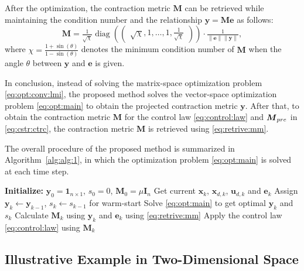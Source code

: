 \documentclass{ifacconf}
\newcommand*{\mv}[1]{\boldsymbol{#1}} %
\newcommand*{\mm}[1]{\boldsymbol{#1}} %
\newcommand*{\norm}[1]{\lVert #1 \rVert} %
\DeclareMathOperator{\mydiag}{{diag}}     %
\begin{document}
After the optimization, the contraction metric $\mm{M}$ can be retrieved while maintaining the condition number and the relationship $\mv{y}=\mm{M}\mv{e}$ as follows:
\begin{equation} \label{eq:retrive:mm}
   \mm{M}
   =
   \tfrac{1}{\sqrt{\chi}}
   \mydiag
   \left(
      \begin{pmatrix}
         \sqrt{\chi}, 1, \ldots, 1, \tfrac{1}{\sqrt{\chi}}
      \end{pmatrix}
   \right)
   \cdot
   \tfrac{1}{\norm{\mv{e}}\norm{\mv{y}}}
   ,
\end{equation}
where $\chi=\tfrac{1+\sin(\theta)}{1-\sin(\theta)}$ denotes the minimum condition number of $\mm{M}$ when the angle $\theta$ between $\mv{y}$ and $\mv{e}$ is given.

In conclusion, instead of solving the matrix-space optimization problem \eqref{eq:opt:conv:lmi}, the proposed method solves the vector-space optimization problem \eqref{eq:opt:main} to obtain the projected contraction metric $\mv{y}$.
After that, to obtain the contraction metric $\mm{M}$ for the control law \eqref{eq:control:law} and $\mm{M}_{\rm{pre}}$ in \eqref{eq:cstr:ctrc}, the contraction metric $\mm{M}$ is retrieved using \eqref{eq:retrive:mm}.
   
The overall procedure of the proposed method is summarized in Algorithm~\ref{alg:alg:1}, in which the optimization problem \eqref{eq:opt:main} is solved at each time step.

\begin{algorithm}[!t]
   \caption{Proposed controller} \label{alg:alg:1}
   \begin{algorithmic}[1]
      \State \textbf{Initialize:} $\mv{y}_0=\mv{1}_{n\times 1}$, $s_0=0$, $\mm{M}_{0}=\mu\mm{I}_n$
            \State Get current $\mv{x}_k$, $\mv{x}_{d,k}$, $\mv{u}_{d,k}$ and $\mv{e}_k$
            \State Assign $\mv{y}_k \leftarrow \mv{y}_{k-1}$, $s_k \leftarrow s_{k-1}$ for warm-start
            \State Solve \eqref{eq:opt:main} to get optimal $\mv{y}_k$ and $s_k$
            \State Calculate $\mm{M}_{k}$ using $\mv{y}_k$ and $\mv{e}_k$ using \eqref{eq:retrive:mm}
            \State Apply the control law \eqref{eq:control:law} using $\mm{M}_{k}$
      \EndFor
   \end{algorithmic}
\end{algorithm}

\subsection{Illustrative Example in Two-Dimensional Space} \label{sec:sub:illustrative}
\end{document}
